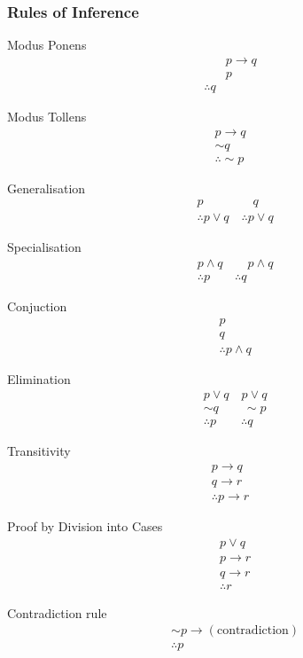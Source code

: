 \subsubsection{Rules of Inference}
\begin{multicols}{2}
Modus Ponens
\begin{align*}
    &p\rightarrow q \\
    &p \\
    \therefore q
\end{align*}

Modus Tollens
\begin{align*}
    p\rightarrow q \\
    \sim q\\
    \therefore \sim p
\end{align*}

Generalisation
\begin{align*}
    &p \qquad\qquad q\\
    &\therefore p\lor q \quad\therefore p\lor q
\end{align*}

Specialisation
\begin{align*}
    &p\land q\qquad p\land q \\
    &\therefore p \qquad \therefore q
\end{align*}

Conjuction
\begin{align*}
    &p\\
    &q\\
    &\therefore p\land q
\end{align*}

Elimination
\begin{align*}
    &p\lor q \quad p\lor q\\
    &\sim q \qquad \sim p\\
    &\therefore p \qquad \therefore q
\end{align*}

Transitivity
\begin{align*}
    p\rightarrow q \\
    q\rightarrow r \\
    \therefore p\rightarrow r
\end{align*}

Proof by Division into Cases
\begin{align*}
    &p\lor q \\
    &p\rightarrow r\\
    &q\rightarrow r\\
    &\therefore r
\end{align*}

Contradiction rule
\begin{align*}
    &\sim p\rightarrow \left(\text{contradiction}\right)\\
    &\therefore p
\end{align*}
\end{multicols}

